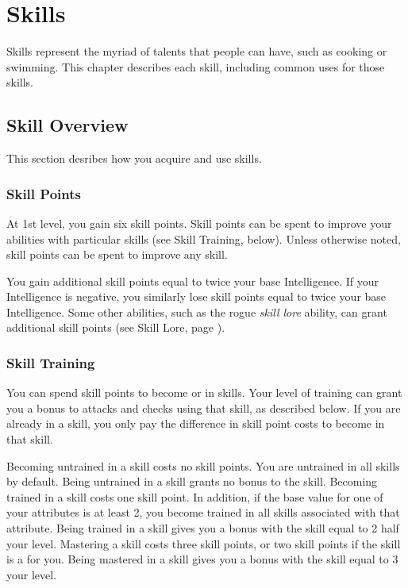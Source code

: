 \chapter{Skills}\label{Skills}

Skills represent the myriad of talents that people can have, such as cooking or swimming.
This chapter describes each skill, including common uses for those skills.

\section{Skill Overview}

    This section desribes how you acquire and use skills.

    \subsection{Skill Points}\label{Skill Points}

        At 1st level, you gain six skill points.
        Skill points can be spent to improve your abilities with particular skills (see Skill Training, below).
        Unless otherwise noted, skill points can be spent to improve any skill.

        You gain additional skill points equal to twice your base Intelligence.
        If your Intelligence is negative, you similarly lose skill points equal to twice your base Intelligence.
        Some other abilities, such as the rogue \textit{skill lore} ability, can grant additional skill points (see Skill Lore, page ).

    \subsection{Skill Training}\label{Skill Training}

        You can spend skill points to become  or  in skills.
        Your level of training can grant you a bonus to attacks and checks using that skill, as described below.
        If you are already  in a skill, you only pay the difference in skill point costs to become  in that skill.

        \begin{itemize}
             Becoming untrained in a skill costs no skill points.
                You are untrained in all skills by default.
                Being untrained in a skill grants no bonus to the skill.
             Becoming trained in a skill costs one skill point.
                In addition, if the base value for one of your attributes is at least 2, you become trained in all skills associated with that attribute.
                Being trained in a skill gives you a bonus with the skill equal to 2 \add half your level.
             Mastering a skill costs three skill points, or two skill points if the skill is a  for you.
                Being mastered in a skill gives you a bonus with the skill equal to 3 \add your level.
        \end{itemize}

